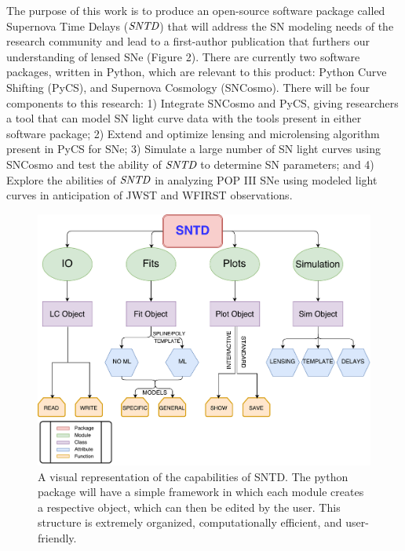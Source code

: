 The purpose of this work is to produce an open-source software package called Supernova Time Delays ($\textit{SNTD}$) that will address the SN modeling needs of the research community and lead to a first-author publication that furthers our understanding of lensed SNe (Figure 2). There are currently two software packages, written in Python, which are relevant to this product: Python Curve Shifting (PyCS), and Supernova Cosmology (SNCosmo). There will be four components to this research: 1) Integrate SNCosmo and PyCS, giving researchers a tool that can model SN light curve data with the tools present in either software package; 2) Extend and optimize lensing and microlensing algorithm present in PyCS for SNe; 3) Simulate a large number of SN light curves using SNCosmo and test the ability of $\textit{SNTD}$ to determine SN parameters; and 4) Explore the abilities of $\textit{SNTD}$ in analyzing POP III SNe using modeled light curves in anticipation of JWST and WFIRST observations. 
\begin{figure}[h]
\centering
\includegraphics[scale=.38]{gra_2017_Flow2.pdf}
\caption{A visual representation of the capabilities of SNTD. The python package will have a simple framework in which each module creates a respective object, which can then be edited by the user. This structure is extremely organized, computationally efficient, and user-friendly.}
\end{figure}

